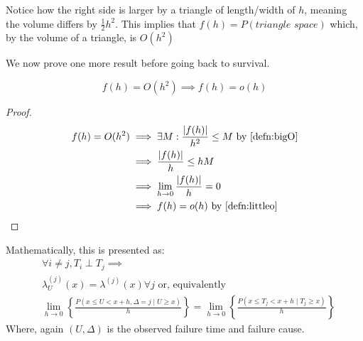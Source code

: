 \documentclass[10pt]{article}
\newcommand{\parenth}[1]{{\left(#1\right)}}
\newcommand{\bracketh}[1]{{\left\{#1\right\}}}
\newcommand{\limzero}[1]{\lim_{#1 \rightarrow 0}}
\begin{document}
Notice how the right side is larger by a triangle of length/width of $h$, meaning the volume differs by $\frac{1}{2}h^2$. This implies that $f(h) = P(\textit{triangle space})$ which, by the volume of a triangle, is $O(h^2)$

We now prove one more result before going back to survival.

\begin{lemma}
\label{lem:littleo_competer}
    $$f(h) = O(h^2) \implies f(h) = o(h)$$
\end{lemma}
\begin{proof}
    \begin{align*}
        f(h) = O(h^2) &\implies \exists M: \frac{\abs{f(h)}}{h^2}\leq M \text{ by \cref{defn:bigO}}\\
        &\implies \frac{\abs{f(h)}}{h} \leq hM\\
        &\implies \limzero{h} \frac{\abs{f(h)}}{h} = 0\\
        &\implies f(h) = o(h) \text{ by \cref{defn:littleo}}
    \end{align*}
\end{proof}


\begin{theorem} 
\label{thm:IndepOfCompeteRisks}
Mathematically, this is presented as:
\begin{align*}
    &\forall i\neq j, T_i\perp T_j \implies \\ &\lambda_U^\parenth{j}(x) = \lambda^\parenth{j}(x) \forall j \text{ or, equivalently}\\
    &\limzero{h} \bracketh{\frac{P(x\leq U < x+h, \Delta=j \mid U\geq x)}{h}} = \limzero{h} \bracketh{\frac{P(x\leq T_j < x+h \mid T_j\geq x)}{h}}
\end{align*}
Where, again $(U, \Delta)$ is the observed failure time and failure cause.
\end{theorem}
\end{document}
